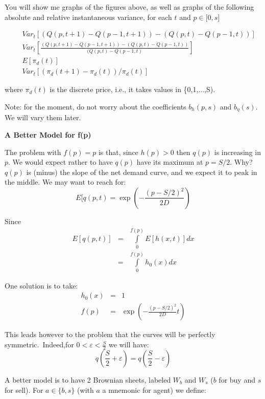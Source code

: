 \documentclass{article}
\begin{document}
\bigskip

You will show me graphs of the figures above, as well as graphs of the
following absolute and relative instantaneous variance, for each $t$ and $%
p\in \lbrack 0,s]$

\begin{eqnarray*}
&&Var_{t}[(Q(p,t+1)-Q(p-1,t+1))-(Q(p,t)-Q(p-1,t))] \\
&&Var_{t}[\frac{(Q(p,t+1)-Q(p-1,t+1))-(Q(p,t)-Q(p-1,t))}{(Q(p,t)-Q(p-1,t)}]
\\
&&E[\pi _{d}(t)] \\
&&Var_{t}[(\pi _{d}(t+1)-\pi _{d}(t))/\pi _{d}(t)]
\end{eqnarray*}

where $\pi _{d}(t)$ is the discrete price, i.e., it takes values in
\{0,1,...,S).

Note: for the moment, do not worry about the coefficients $b_{h}(p,s)$ and $%
b_{\eta }(s)$. We will vary them later.

\bigskip

\textbf{A Better Model for f(p)}

The problem with $f(p)=p$ is that, since $h(p)>0$ then $q(p)$ is increasing
in $p$. We would expect rather to have $q(p)$ have its maximum at $p=S/2$.
Why?$q(p)$ is (minus) the slope of the net demand curve, and we expect it to
peak in the middle. We may want to reach for:%
\begin{equation*}
E[q(p,t)=\exp (-\frac{(p-S/2)^{2}}{2D})
\end{equation*}

Since%
\begin{eqnarray*}
E[q(p,t)] &=&\int\limits_{0}^{f(p)}E[h(x,t)]dx \\
&=&\int\limits_{0}^{f(p)}h_{0}(x)dx
\end{eqnarray*}

One solution is to take:%
\begin{eqnarray*}
h_{0}(x) &=&1 \\
f(p) &=&\exp (-\frac{(p-S/2)^{2}}{2D}t)
\end{eqnarray*}

This leads however to the problem that the curves will be perfectly
symmetric.\ Indeed,for $0<\varepsilon <\frac{S}{2}$ we will have:%
\begin{equation*}
q(\frac{S}{2}+\varepsilon )=q(\frac{S}{2}-\varepsilon )
\end{equation*}

A better model is to have 2 Brownian sheets, labeled $W_{b}$ and $W_{s}$ ($b$
for buy and $s$ for sell). For $a\in \{b,s\}$ (with $a$ a mnemonic for
agent) we define:
\end{document}
